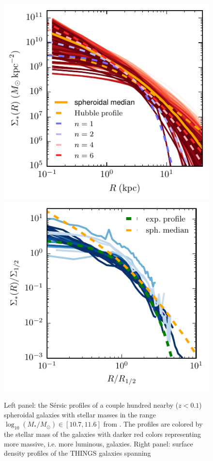\begin{figure}[ht]
\centerline{
\includegraphics[scale=1.05]{fig/szomoru_pro.pdf}
\includegraphics[scale=1.05]{fig/things_pro.pdf}
}
\caption{Left  panel:  the S\'ersic profiles of a couple hundred nearby ($z<0.1$) spheroidal galaxies with stellar masses in the range
$\log_{10}(M_*/M_\odot)\in [10.7, 11.6]$ from \href{http://adsabs.harvard.edu/abs/2013ApJ...763...73S}{\citet{szomoru_etal13}}.
The profiles are colored by the stellar mass of the galaxies with darker red colors representing more massive, i.e. more luminous, galaxies. Right panel: surface density profiles of the THINGS galaxies spanning 
}
\end{figure}
